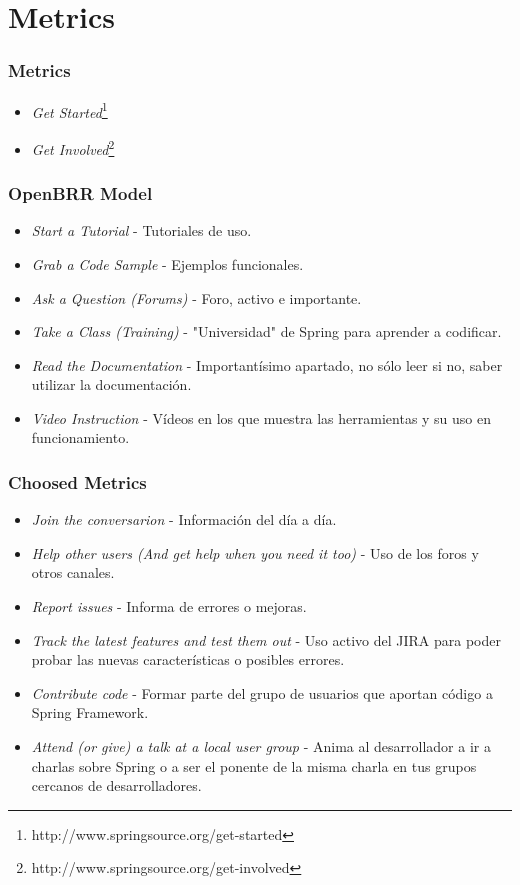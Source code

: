 \documentclass[xcolor=dvipsnames]{beamer}
\begin{document}
\section{Metrics}
\begin{frame}[allowframebreaks]
\frametitle{Metrics}
\begin{itemize}
    \item \emph{Get Started}\footnote{http://www.springsource.org/get-started}
    \item \emph{Get Involved}\footnote{http://www.springsource.org/get-involved}
\end{itemize}
\end{frame}

\begin{frame}[allowframebreaks]
\frametitle{OpenBRR Model}
\begin{itemize}
    \item \emph{Start a Tutorial} - Tutoriales de uso.
    \item \emph{Grab a Code Sample} - Ejemplos funcionales.
    \item \emph{Ask a Question (Forums)} - Foro, activo e importante.
    \item \emph{Take a Class (Training)} - "Universidad" de Spring para aprender a codificar.
    \item \emph{Read the Documentation} - Important\'isimo apartado, no s\'olo leer si no, saber utilizar la documentaci\'on.
    \item \emph{Video Instruction} - V\'ideos en los que muestra las herramientas y su uso en funcionamiento.
\end{itemize}
\end{frame}

\begin{frame}[allowframebreaks]
\frametitle{Choosed Metrics}
\begin{itemize}
    \item \emph{Join the conversarion} - Informaci\'on del d\'ia a d\'ia.
    \item \emph{Help other users (And get help when you need it too)} - Uso de los foros y otros canales.
    \item \emph{Report issues} - Informa de errores o mejoras.
    \item \emph{Track the latest features and test them out} - Uso activo del JIRA para poder probar las nuevas caracter\'isticas o posibles errores.
    \item \emph{Contribute code} - Formar parte del grupo de usuarios que aportan c\'odigo a Spring Framework.
    \item \emph{Attend (or give) a talk at a local user group} - Anima al desarrollador a ir a charlas sobre Spring o a ser el ponente de la misma charla en tus grupos cercanos de desarrolladores.
\end{itemize}
\end{frame}
\end{document}
